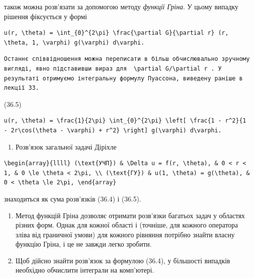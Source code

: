 \documentclass[
  ukrainian,
]{article}
\providecommand{\tightlist}{%
  \setlength{\itemsep}{0pt}\setlength{\parskip}{0pt}}
\begin{document}
також можна розв'язати за допомогою методу \emph{функції Гріна}. У цьому
випадку рішення фіксується у формі

\begin{verbatim}
u(r, \theta) = \int_{0}^{2\pi} \frac{\partial G}{\partial r} (r, \theta, 1, \varphi) g(\varphi) d\varphi.
\end{verbatim}

\begin{verbatim}
Останнє співвідношення можна переписати в більш обчислювально зручному вигляді, явно підставивши вираз для  \partial G/\partial r . У результаті отримуємо інтегральну формулу Пуассона, виведену раніше в лекції 33.
\end{verbatim}

(36.5)

\begin{verbatim}
u(r, \theta) = \frac{1}{2\pi} \int_{0}^{2\pi} \left[ \frac{1 - r^2}{1 - 2r\cos(\theta - \varphi) + r^2} \right] g(\varphi) d\varphi.
\end{verbatim}

\begin{enumerate}
\def\labelenumi{\arabic{enumi}.}
\setcounter{enumi}{1}
\tightlist
\item
  Розв'язок загальної задачі Діріхле
\end{enumerate}

\begin{verbatim}
\begin{array}{llll} (\text{УЧП}) & \Delta u = f(r, \theta), & 0 < r < 1, & 0 \le \theta < 2\pi, \\ (\text{ГУ}) & u(1, \theta) = g(\theta), & 0 < \theta \le 2\pi, \end{array}
\end{verbatim}

знаходиться як сума розв'язків (36.4) і (36.5).

\begin{enumerate}
\def\labelenumi{\arabic{enumi}.}
\setcounter{enumi}{2}
\item
  Метод функцій Гріна дозволяє отримати розв'язки багатьох задач у
  областях різних форм. Однак для кожної області і (точніше, для кожного
  оператора зліва від граничної умови) для кожного рівняння потрібно
  знайти власну функцію Гріна, і це не завжди легко зробити.
\item
  Щоб дійсно знайти розв'язок за формулою (36.4), у більшості випадків
  необхідно обчислити інтеграли на комп'ютері.
\end{enumerate}
\end{document}
